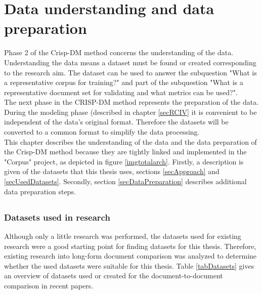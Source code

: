 \pagebreak
\chapter{Data understanding and data preparation}
\label{chapterUnderstandingPreperation}

Phase 2 of the Crisp-DM method concerns the understanding of the data. Understanding the data means a dataset must be found or created corresponding to the research aim. The dataset can be used to answer the subquestion "What is a representative corpus for training?" and part of the subquestion "What is a representative document set for validating and what metrics can be used?".\\ %

The next phase in the CRISP-DM method represents the preparation of the data. During the modeling phase (described in chapter \ref{secRCIV} it is convenient to be independent of the data's original format. Therefore the datasets will be converted to a common format to simplify the data processing. \\




This chapter describes the understanding of the data and the data preparation of the Crisp-DM method because they are tightly linked and implemented in the "Corpus" project, as depicted in figure \ref{imgtotalarch}. Firstly, a description is given of the datasets that this thesis uses, sections \ref{secApproach} and \ref{secUsedDatasets}. Secondly, section \ref{secDataPreparation} describes additional data preparation steps.

\section{}
\subsection{Datasets used in research}
\label{secDatasetsResearch}
Although only a little research was performed, the datasets used for existing research were a good starting point for finding datasets for this thesis. Therefore, existing research into long-form document comparison was analyzed to determine whether the used datasets were suitable for this thesis. Table \ref{tabDatasets} gives an overview of datasets used or created for the document-to-document comparison in recent papers.\\


